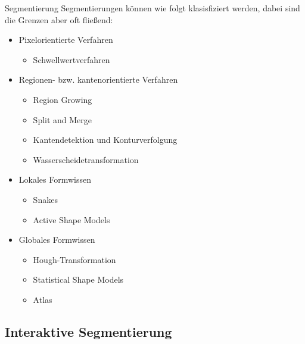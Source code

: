 \begin{defi}{Segmentierung}
    Segmentierungen können wie folgt klasisfiziert werden, dabei sind die Grenzen aber oft fließend:
    \begin{itemize}
        \item Pixelorientierte Verfahren
              \begin{itemize}
                  \item Schwellwertverfahren
              \end{itemize}
        \item Regionen- bzw. kantenorientierte Verfahren
              \begin{itemize}
                  \item Region Growing
                  \item Split and Merge
                  \item Kantendetektion und Konturverfolgung
                  \item Wasserscheidetransformation
              \end{itemize}
        \item Lokales Formwissen
              \begin{itemize}
                  \item Snakes
                  \item Active Shape Models
              \end{itemize}
        \item Globales Formwissen
              \begin{itemize}
                  \item Hough-Transformation
                  \item Statistical Shape Models
                  \item Atlas
              \end{itemize}
    \end{itemize}
\end{defi}

\subsection{Interaktive Segmentierung}

